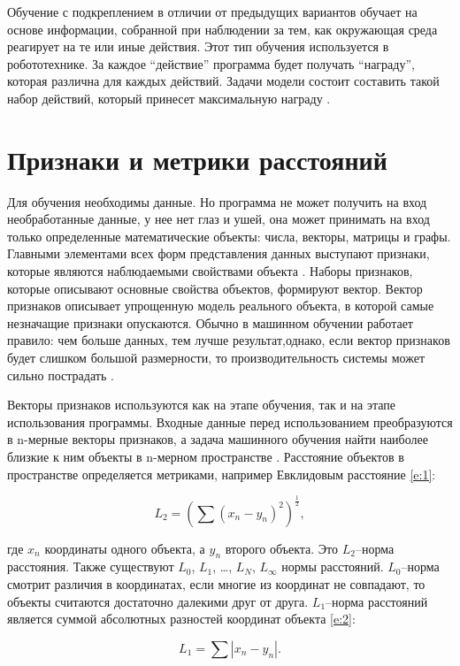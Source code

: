 Обучение с подкреплением в отличии от предыдущих вариантов обучает на основе информации, собранной при наблюдении за тем, как окружающая среда реагирует на те или иные действия. Этот тип обучения используется в робототехнике. За каждое “действие” программа будет получать “награду”, которая различна для каждых действий. Задачи модели состоит составить такой набор действий, который принесет максимальную награду \cite{8,10}.


\section{Признаки и метрики расстояний}

Для обучения необходимы данные. Но программа не может получить на вход необработанные данные, у нее нет глаз и ушей, она может принимать на вход только определенные математические объекты: числа, векторы, матрицы и графы. 
Главными элементами всех форм представления данных выступают признаки, которые являются наблюдаемыми свойствами объекта \cite{14}. Наборы признаков, которые описывают основные свойства объектов, формируют вектор. 
Вектор признаков описывает упрощенную модель реального объекта, в которой самые незначащие признаки опускаются. Обычно в машинном обучении работает правило: чем больше данных, тем лучше результат,однако, если вектор признаков будет слишком большой размерности, то производительность системы может сильно пострадать \cite{6,24}.

Векторы признаков используются как на этапе обучения, так и на этапе использования программы. Входные данные перед использованием преобразуются в n-мерные векторы признаков, а задача машинного обучения найти наиболее близкие к ним объекты в n-мерном пространстве \cite{11}. Расстояние объектов в пространстве определяется метриками, например Евклидовым расстояние \ref{e:1}:


\begin{equation} \label{e:1}
L_{2} = (\sum (x_{n}-y_{n})^2)^\frac{1}{2},
\end{equation}

где $x_{n}$ координаты одного объекта, а $y_{n}$ второго объекта.
Это $L_{2}$--норма расстояния. Также существуют $L_{0}$,  $L_{1}$, …, $L_{N}$, $L_{\infty}$ нормы расстояний. $L_{0}$--норма смотрит различия в координатах, если многие из координат не совпадают, то объекты считаются достаточно далекими друг от друга. $L_{1}$--норма расстояний является суммой абсолютных разностей координат объекта \ref{e:2}:

\begin{equation}\label{e:2}
L_{1} = \sum |x_{n}-y_{n}|.
\end{equation}


